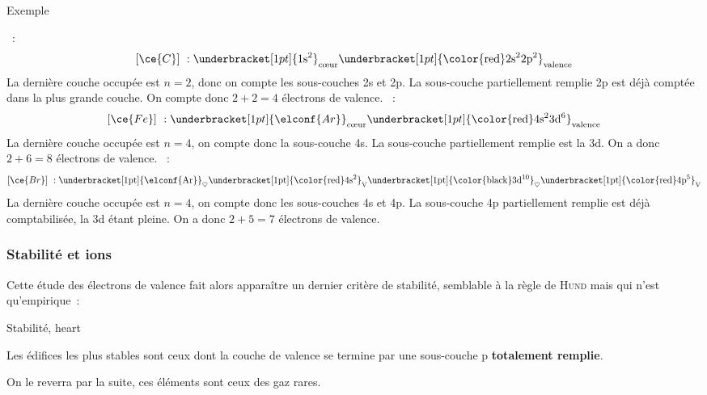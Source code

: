 \documentclass[../main/main.tex]{subfiles}
\begin{document}
\begin{rexem}{Exemple}
    \begin{itemize}[label=$\diamond$, leftmargin=20pt]
        ~:
            \[[\ce{C}]~:
            \underbracket[1pt]{\strut \rm 1s^2}_{\text{cœur}}
            \underbracket[1pt]{\strut \rm \color{red}2s^22p^2}_{\text{valence}}\]
            La dernière couche occupée est $n=2$, donc on compte les
            sous-couches 2s et 2p. La sous-couche partiellement
            remplie 2p est déjà comptée dans la plus grande couche. On compte
            donc $2+2=4$ électrons de valence.
        ~:
            \[[\ce{Fe}]~:
            \underbracket[1pt]{\strut \elconf{Ar}}_{\text{cœur}}
            \underbracket[1pt]{\strut \rm \color{red}4s^23d^6}_{\text{valence}}\]
            La dernière couche occupée est $n=4$, on compte donc la sous-couche
            4s. La sous-couche partiellement remplie est la 3d. On a donc $2+6 =
            8$ électrons de valence.
        ~:
            \[[\ce{Br}]~: \rm
            \underbracket[1pt]{\strut \elconf{Ar}}_{\heartsuit}
            \underbracket[1pt]{\strut \rm \color{red}4s^2}_{\rm V}
            \underbracket[1pt]{\strut \rm \color{black}3d^{10}}_{\heartsuit}
            \underbracket[1pt]{\strut \rm \color{red}4p^5}_{\rm V}\]
            La dernière couche occupée est $n=4$, on compte donc les
            sous-couches 4s et 4p. La sous-couche 4p partiellement remplie est
            déjà comptabilisée, la 3d étant pleine. On a donc $2+5=7$ électrons
            de valence.
    \end{itemize}
\end{rexem}

\subsubsection{Stabilité et ions}

Cette étude des électrons de valence fait alors apparaître un dernier critère de
stabilité, semblable à la règle de \textsc{Hund} mais qui n'est qu'empirique~:

\begin{tror}{Stabilité, heart}
    \begin{center}
        Les édifices les plus stables sont ceux dont la couche de valence se
        termine par une sous-couche p \textbf{totalement remplie}.
    \end{center}
    On le reverra par la suite, ces éléments sont ceux des gaz rares.
\end{tror}
\end{document}
